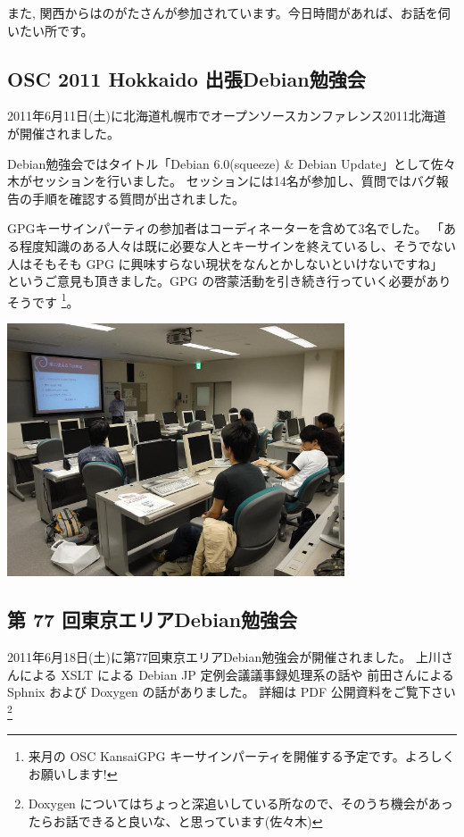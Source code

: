 \documentclass[mingoth,a4paper]{jsarticle}
\begin{document}
また, 関西からはのがたさんが参加されています。今日時間があれば、お話を伺いたい所です。

\subsection{OSC 2011 Hokkaido 出張Debian勉強会}

2011年6月11日(土)に北海道札幌市でオープンソースカンファレンス2011北海道が開催されました。

Debian勉強会ではタイトル「Debian 6.0(squeeze) \& Debian Update」として佐々木がセッションを行いました。
セッションには14名が参加し、質問ではバグ報告の手順を確認する質問が出されました。

GPGキーサインパーティの参加者はコーディネーターを含めて3名でした。
「ある程度知識のある人々は既に必要な人とキーサインを終えているし、そうでない人はそもそも GPG に興味すらない現状をなんとかしないといけないですね」
というご意見も頂きました。GPG の啓蒙活動を引き続き行っていく必要がありそうです
\footnote{来月の OSC Kansai GPG キーサインパーティを開催する予定です。よろしくお願いします!}。

\begin{center}
\includegraphics[width=10cm]{image201106/osc11do.jpg}
\end{center}

\subsection{第 77 回東京エリアDebian勉強会}

2011年6月18日(土)に第77回東京エリアDebian勉強会が開催されました。
上川さんによる XSLT による Debian JP 定例会議議事録処理系の話や
前田さんによる Sphnix および Doxygen の話がありました。
詳細は PDF 公開資料をご覧下さい%
\footnote{Doxygen についてはちょっと深追いしている所なので、そのうち機会があったらお話できると良いな、と思っています(佐々木)}
\end{document}
